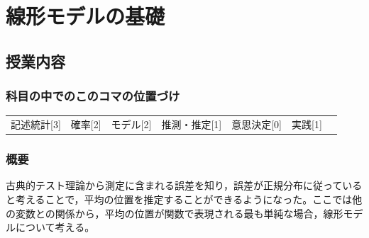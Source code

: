 \section{線形モデルの基礎}
\label{D1_lesson09}

\subsection{授業内容}
\subsubsection{科目の中でのこのコマの位置づけ}
\begin{tabular}[t]{ccccccc}
    記述統計[3] & 確率[2] & モデル[2] & 推測・推定[1] & 意思決定[0] & 実践[1]
\end{tabular}

\subsubsection{概要}
古典的テスト理論から測定に含まれる誤差を知り，誤差が正規分布に従っていると考えることで，平均の位置を推定することができるようになった。ここでは他の変数との関係から，平均の位置が関数で表現される最も単純な場合，線形モデルについて考える。
